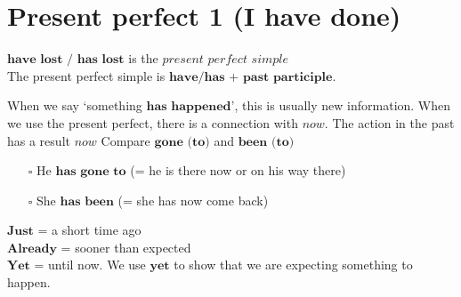 \section{Present perfect 1 (I have done)}
\label{Present perfect 1}
$\textbf{have lost / has lost}$ is the $\textit{present perfect simple}$ \\
The present perfect simple is $\textbf{have/has}$ + $\textbf{past participle}$. \\
When we say `something $\textbf{has happened}$', this is usually new information.
When we use the present perfect, there is a connection with $\textit{now}$. The action in the past has a result $\textit{now}$
Compare $\textbf{gone (to)}$ and $\textbf{been (to)}$
\begin{itemize}
    \item[$\square$] He $\textbf{has gone to}$ (= he is there now or on his way there)
    \item[$\square$] She $\textbf{has been}$ (= she has now come back)
\end{itemize}
$\textbf{Just}$ = a short time ago \\
$\textbf{Already}$ = sooner than expected \\
$\textbf{Yet}$ = until now. We use $\textbf{yet}$ to show that we are expecting something to happen. \\

